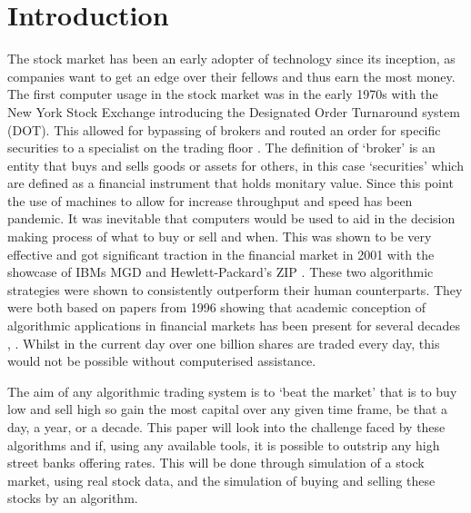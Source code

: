 \documentclass[conference]{IEEEtran}
\begin{document}

\section{Introduction}

The stock market has been an early adopter of technology since its inception, as companies want to get an edge over their fellows and thus earn the most money. The first computer usage in the stock market was in the early 1970s with the New York Stock Exchange introducing  the Designated Order Turnaround system (DOT). This allowed for bypassing of brokers and routed an order for specific securities to a specialist on the trading floor \cite{Hasbrouck}. The definition of `broker' is an entity that buys and sells goods or assets for others, in this case `securities' which are defined as a financial instrument that holds monitary value. Since this point the use of machines to allow for increase throughput and speed has been pandemic. It was inevitable that computers would be used to aid in the decision making process of what to buy or sell and when. This was shown to be very effective and got significant traction in the financial market in 2001 with the showcase of IBMs MGD and  Hewlett-Packard's ZIP \cite{Tesauro2001}. These two algorithmic strategies were shown to consistently outperform their human counterparts. They were both based on papers from 1996 showing that academic conception of algorithmic applications in financial markets has been present for several decades \cite{Gjerstad1998}, \cite{Cliff1998}. Whilst in the current day over one billion shares are traded every day, this would not be possible without computerised assistance. 

The aim of any algorithmic trading system is to `beat the market' that is to buy low and sell high so gain the most capital over any given time frame, be that a day, a year, or a decade. This paper will look into the challenge faced by these algorithms and if, using any available tools, it is possible to outstrip any high street banks offering rates. This will be done through simulation of a stock market, using real stock data, and the simulation of buying and selling these stocks by an algorithm.
\end{document}
